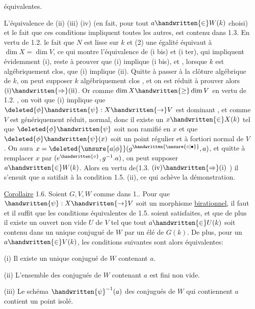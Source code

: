 équivalentes.

L'équivalence de (ii) (iii) (iv) (en fait, pour tout $a\handwritten{\in}W(k)$ choisi) et le fait que ces conditions impliquent toutes les autres, est contenu dans 1.3. En vertu de 1.2. le fait que $N$ est lisse sur $k$ et (2) une égalité équivaut à $\dim X=\dim V$, ce qui montre l'équivalence de (i bis) et (i ter), qui impliquent évidemment (i), reste à prouver que (i) implique (i bis), et , lorsque $k$ est algébriquement clos, que (i) implique (ii). Quitte à passer à la clôture algébrique de $k$, on peut supposer $k$ algébriquement clos , et on est réduit à prouver alors $\text{(i)}\handwritten{\Rightarrow}\text{(ii)}$. Or comme $\dim X\handwritten{\geq}\dim V$ en vertu de 1.2. , on voit que (i) implique que $\deleted{\phi}\handwritten{\psi}:X\handwritten{\to}V$ est dominant , et comme $V$ est génériquement réduit,   normal, donc il existe un  $x\handwritten{\in}X(k)$ tel que $\deleted{\phi}\handwritten{\psi}$ soit non ramifié en $x$ et que $\deleted{\phi}\handwritten{\psi}(x)$ soit un point  régulier et à fortiori normal de $V$. On aura $x=\deleted{\unsure{a|\phi}}(g^{\handwritten{\unsure{\circ|\bullet}}},a)$, et quitte à remplacer $x$ par $(e^{\handwritten{\circ}},g^{-1}.a)$, on peut supposer $a\handwritten{\in}W(k)$. Alors en vertu de(1.3. $\text{(iv)}\handwritten{\Rightarrow}\text{(i)}$ ) il s'ensuit que $a$ satifait à la condition 1.5. (ii), ce qui achève la démonstration.

\uline{Corollaire} 1.6. Soient $G,V,W$ comme dans 1..  Pour que $\handwritten{\psi}:X\handwritten{\to}V$ soit un morphisme \uline{birationnel}, il faut et il suffit que les conditions équivalentes de 1.5. soient satisfaites, et que de plus il existe un ouvert non vide $U$ de $V$ tel que tout $a\handwritten{\in}U(k)$ soit contenu dans un unique conjugué de $W$ par un élé de $G(k)$. De plus, pour un $a\handwritten{\in}V(k)$, les conditions suivantes sont alors équivalentes:

(i) Il existe un unique conjugué de $W$ contenant $a$.

(ii) L'ensemble des conjugués de $W$ contenant $a$ est fini non vide.

(iii) Le schéma $\handwritten{\psi}^{-1}(a)$ des conjugués de $W$ qui contiennent $a$ contient un point isolé.
